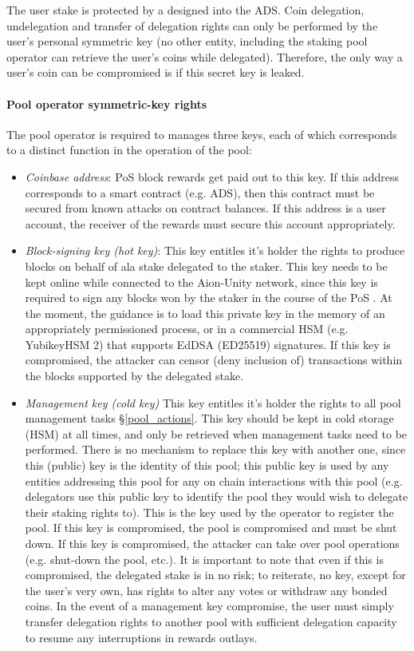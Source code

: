 The user stake is protected by a  designed into the ADS. Coin delegation, undelegation and transfer of delegation rights can only be performed by the user's personal symmetric key (no other entity, including the staking pool operator can retrieve the user's coins while delegated). Therefore, the only way a user's coin can be compromised is if this secret key is leaked.  
    
\paragraph{Pool operator symmetric-key rights} The pool operator is required to manages three keys, each of which corresponds to a distinct function in the operation of the pool: 
\begin{itemize}
    \item \textit{Coinbase address}: PoS block rewards get paid out to this key. If this address corresponds to a smart contract (e.g. ADS), then this contract must be secured from known attacks on contract balances. If this address is a user account, the receiver of the rewards must secure this account appropriately.  
    \item \textit{Block-signing key (hot key)}: This key entitles it's holder the rights to produce blocks on behalf of ala stake delegated to the staker. This key needs to be kept online while connected to the Aion-Unity network, since this key is required to sign any blocks won by the staker in the course of the PoS . At the moment, the guidance is to load this private key in the memory of an appropriately permissioned process, or in a commercial HSM (e.g. YubikeyHSM 2) that supports EdDSA (ED25519) signatures. If this key is compromised, the attacker can censor (deny inclusion of) transactions within the blocks supported by the delegated stake. 
    \item \textit{Management key (cold key)} This key entitles it's holder the rights to all pool management tasks \S\ref{pool_actions}. This key should be kept in cold storage (HSM) at all times, and only be retrieved when management tasks need to be performed. There is no mechanism to replace this key with another one, since this (public) key is the identity of this pool; this public key is used by any entities addressing this pool for any on chain interactions with this pool (e.g. delegators use this public key to identify the pool they would wish to delegate their staking rights to). This is the key used by the operator to register the pool. If this key is compromised, the pool is compromised and must be shut down. If this key is compromised, the attacker can take over pool operations (e.g. shut-down the pool, etc.). It is important to note that even if this  is compromised, the delegated stake is in no risk; to reiterate, no key, except for the user's very own, has rights to alter any votes or withdraw any bonded coins. In the event of a management key compromise, the user must simply transfer delegation rights to another pool with sufficient delegation capacity to resume any interruptions in rewards outlays. 
\end{itemize}

